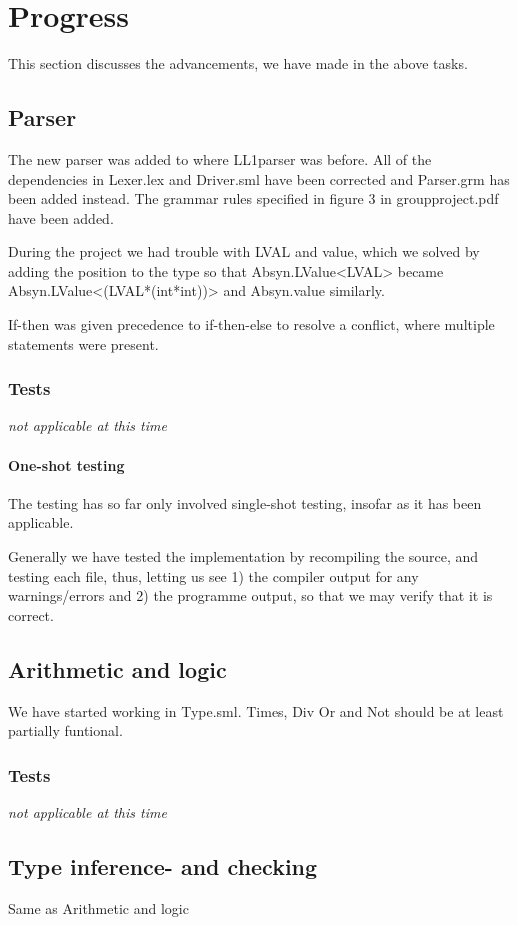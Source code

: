 \documentclass[11pt]{article}
\begin{document}
\section{Progress}
This section discusses the advancements, we have made in the above tasks.

\subsection{Parser}
The new parser was added to where LL1parser was before.
All of the dependencies in Lexer.lex and Driver.sml have been corrected and Parser.grm has been added instead.
The grammar rules specified in figure 3 in groupproject.pdf have been added.

During the project we had trouble with LVAL and value, which we solved by adding the position to the type
so that Absyn.LValue<LVAL> became Absyn.LValue<(LVAL*(int*int))> and Absyn.value similarly.

If-then was given precedence to if-then-else to resolve a conflict, where multiple statements were present.

\subsubsection{Tests}
{\it not applicable at this time}%
\paragraph{One-shot testing}
The testing has so far only involved single-shot testing, insofar as it has
been applicable.

Generally we have tested the implementation by recompiling the source, and
testing each file, thus, letting us see 1) the compiler output for any
warnings/errors and 2) the programme output, so that we may verify that it
is correct.

\subsection{Arithmetic and logic}
We have started working in Type.sml. Times, Div Or and Not should be at least partially funtional.

\subsubsection{Tests}
{\it not applicable at this time}%

\subsection{Type inference- and checking}
Same as Arithmetic and logic
\end{document}
